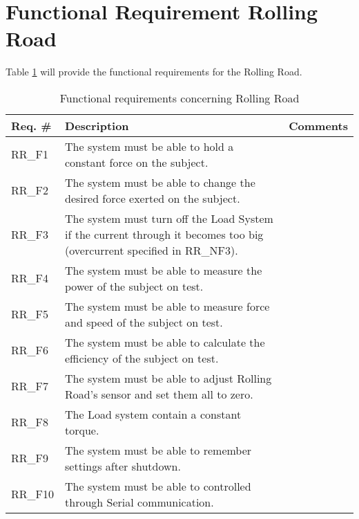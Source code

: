 \section{Functional Requirement Rolling Road}
Table \ref{FREQ_RR} will provide the functional requirements for the Rolling Road.
\begin{table}[h!]
	\label{FREQ_RR}
	\centering
	\begin{tabular}{|p{2 cm}|p{10 cm}|p{2 cm}|}
		\hline
		\textbf{Req. \#} & \textbf{Description} & \textbf{Comments} \\\hline
		RR\_F1
		& The system must be able to hold a constant force on the subject.
		&  \\ \hline
		RR\_F2
		& The system must be able to change the desired force exerted on the subject. 
		&  \\ \hline
		RR\_F3
		& The system must turn off the Load System if the current through it becomes too big (overcurrent specified in RR\_NF3).
		&  \\ \hline
		RR\_F4
		& The system must be able to measure the power of the subject on test.
		&  \\ \hline
		RR\_F5
		& The system must be able to measure force and speed of the subject on test.
		&  \\ \hline
		RR\_F6
		& The system must be able to calculate the efficiency of the subject on test. 
		&  \\ \hline
		RR\_F7
		& The system must be able to adjust Rolling Road's sensor and set them all to zero. 
		&  \\ \hline
		RR\_F8
		& The Load system contain a constant torque.
		&  \\ \hline
		RR\_F9
		& The system must be able to remember settings after shutdown.
		&  \\ \hline
		RR\_F10
		& The system must be able to controlled through Serial communication.  
		&  \\ \hline
	\end{tabular}
	\caption{Functional requirements concerning Rolling Road}
\end{table}
\newpage